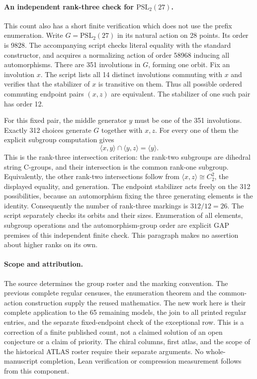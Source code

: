 \documentclass[10pt]{article}
\begin{document}
\paragraph{An independent rank-three check for $\mathrm{PSL}_2(27)$.}
This count also has a short finite verification which does not use the
prefix enumeration. Write $G=\mathrm{PSL}_2(27)$ in its natural action on
28 points. Its order is 9828. The accompanying script checks literal
equality with the standard constructor, and acquires a normalizing action
of order 58968 inducing all automorphisms. There are 351 involutions in
$G$, forming one orbit. Fix an involution $x$. The script lists all 14
distinct involutions commuting with $x$ and verifies that the stabilizer
of $x$ is transitive on them. Thus all possible ordered commuting endpoint
pairs $(x,z)$ are equivalent. The stabilizer of one such pair has order 12.

For this fixed pair, the middle generator $y$ must be one of the 351
involutions. Exactly 312 choices generate $G$ together with $x,z$.
For every one of them the explicit subgroup computation gives
\[
 \langle x,y\rangle\cap\langle y,z\rangle=\langle y\rangle.
\]
This is the rank-three intersection criterion: the rank-two subgroups
are dihedral string C-groups, and their intersection is the common
rank-one subgroup. Equivalently, the other rank-two intersections follow
from $\langle x,z\rangle\cong C_2^2$, the displayed equality, and generation.
The endpoint stabilizer acts freely on the 312 possibilities, because an
automorphism fixing the three generating elements is the identity.
Consequently the number of rank-three markings is $312/12=26$.
The script separately checks its orbits and their sizes. Enumeration of
all elements, subgroup operations and the automorphism-group order are
explicit GAP premises of this independent finite check. This paragraph
makes no assertion about higher ranks on its own.

\paragraph{Scope and attribution.}
The source determines the group roster and the marking convention.
The previous complete regular censuses, the enumeration theorem and the
common-action construction supply the reused mathematics. The new work
here is their complete application to the 65 remaining models, the join
to all printed regular entries, and the separate fixed-endpoint check of
the exceptional row. This is a correction of a finite published count,
not a claimed solution of an open conjecture or a claim of priority.
The chiral columns, first atlas, and the scope of the historical ATLAS
roster require their separate arguments. No whole-manuscript completion,
Lean verification or compression measurement follows from this component.
\end{document}
